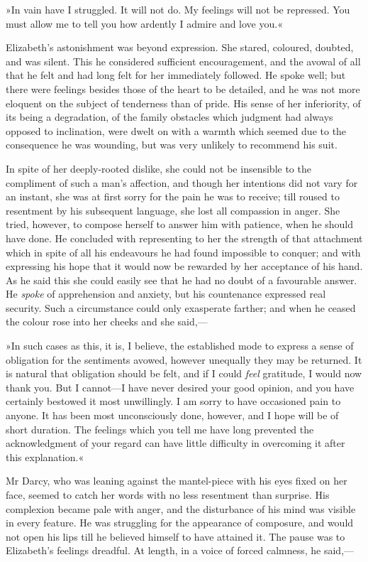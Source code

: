 »In vain have I struggled. It will not do. My feelings will not be repressed. You must allow me to tell you how ardently I admire and love you.«

Elizabeth's astonishment was beyond expression. She stared, coloured, doubted, and was silent. This he considered sufficient encouragement, and the avowal of all that he felt and had long felt for her immediately followed. He spoke well; but there were feelings besides those of the heart to be detailed, and he was not more eloquent on the subject of tenderness than of pride. His sense of her inferiority, of its being a degradation, of the family obstacles which judgment had always opposed to inclination, were dwelt on with a warmth which seemed due to the consequence he was wounding, but was very unlikely to recommend his suit.

In spite of her deeply-rooted dislike, she could not be insensible to the compliment of such a man's affection, and though her intentions did not vary for an instant, she was at first sorry for the pain he was to receive; till roused to resentment by his subsequent language, she lost all compassion in anger. She tried, however, to compose herself to answer him with patience, when he should have done. He concluded with representing to her the strength of that attachment which in spite of all his endeavours he had found impossible to conquer; and with expressing his hope that it would now be rewarded by her acceptance of his hand. As he said this she could easily see that he had no doubt of a favourable answer. He \textit{spoke} of apprehension and anxiety, but his countenance expressed real security. Such a circumstance could only exasperate farther; and when he ceased the colour rose into her cheeks and she said,—

»In such cases as this, it is, I believe, the established mode to express a sense of obligation for the sentiments avowed, however unequally they may be returned. It is natural that obligation should be felt, and if I could \textit{feel} gratitude, I would now thank you. But I cannot—I have never desired your good opinion, and you have certainly bestowed it most unwillingly. I am sorry to have occasioned pain to anyone. It has been most unconsciously done, however, and I hope will be of short duration. The feelings which you tell me have long prevented the acknowledgment of your regard can have little difficulty in overcoming it after this explanation.«

Mr Darcy, who was leaning against the mantel-piece with his eyes fixed on her face, seemed to catch her words with no less resentment than surprise. His complexion became pale with anger, and the disturbance of his mind was visible in every feature. He was struggling for the appearance of composure, and would not open his lips till he believed himself to have attained it. The pause was to Elizabeth's feelings dreadful. At length, in a voice of forced calmness, he said,—

